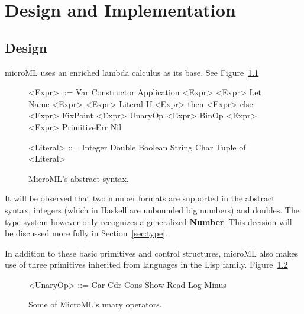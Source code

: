 \documentclass[12pt, a4paper]{report}
\begin{document}
\chapter{Design and Implementation}
\section{Design}
microML uses an enriched lambda calculus as its base. See Figure~\ref{fig:syntax}

\begin{figure}
    \begin{minipage}[t]{0.5\textwidth}
        \begin{grammar}
            <Expr> ::= Var
            \alt{} Constructor 
            \alt{} Application <Expr> <Expr>
            \alt{} Let Name <Expr> <Expr>
            \alt{} Literal 
            \alt{} If <Expr> then <Expr> else <Expr>
            \alt{} FixPoint <Expr>
            \alt{} UnaryOp <Expr>
            \alt{} BinOp <Expr> <Expr>
            \alt{} PrimitiveErr 
            \alt{} Nil
        \end{grammar}
    \end{minipage}
    \begin{minipage}[t]{0.5\textwidth}
        \begin{grammar}
            <Literal> ::= Integer
            \alt{} Double
            \alt{} Boolean
            \alt{} String
            \alt{} Char
            \alt{} Tuple of <Literal>
        \end{grammar}
    \end{minipage}
    \caption{MicroML's abstract syntax.}
\label{fig:syntax}
\end{figure}

It will be observed that two number formats are supported in the abstract syntax, integers (which in
Haskell are unbounded big numbers) and doubles. The type system however only recognizes a
generalized \textbf{Number}. This decision will be discussed more fully in Section~\ref{sec:type}.

In addition to these basic primitives and control structures, microML also makes use of three
primitives inherited from languages in the Lisp family. Figure~\ref{fig:unary}

\begin{figure}
        \begin{grammar}
            <UnaryOp> ::= Car 
            \alt{} Cdr
            \alt{} Cons
            \alt{} Show
            \alt{} Read
            \alt{} Log
            \alt{} Minus
        \end{grammar}
    \caption{Some of MicroML's unary operators.}
\label{fig:unary}
\end{figure}
\end{document}
